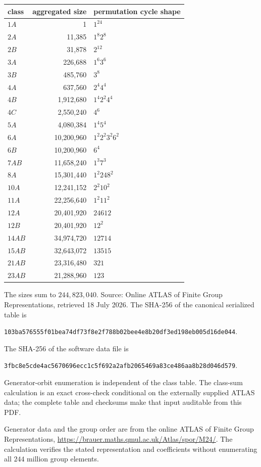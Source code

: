 \documentclass[11pt]{article}
\begin{document}
\begin{center}\scriptsize
\begin{tabular}{@{}lrl@{}}\toprule
class & aggregated size & permutation cycle shape\\\midrule
$1A$&1&$1^{24}$\\
$2A$&11,385&$1^8 2^8$\\
$2B$&31,878&$2^{12}$\\
$3A$&226,688&$1^6 3^6$\\
$3B$&485,760&$3^8$\\
$4A$&637,560&$2^4 4^4$\\
$4B$&1,912,680&$1^4 2^2 4^4$\\
$4C$&2,550,240&$4^6$\\
$5A$&4,080,384&$1^4 5^4$\\
$6A$&10,200,960&$1^2 2^2 3^2 6^2$\\
$6B$&10,200,960&$6^4$\\
$7AB$&11,658,240&$1^3 7^3$\\
$8A$&15,301,440&$1^2 2 4 8^2$\\
$10A$&12,241,152&$2^2 10^2$\\
$11A$&22,256,640&$1^2 11^2$\\
$12A$&20,401,920&$2 4 6 12$\\
$12B$&20,401,920&$12^2$\\
$14AB$&34,974,720&$1 2 7 14$\\
$15AB$&32,643,072&$1 3 5 15$\\
$21AB$&23,316,480&$3 21$\\
$23AB$&21,288,960&$1 23$\\\bottomrule
\end{tabular}
\end{center}
The sizes sum to $244{,}823{,}040$.  Source: Online ATLAS of Finite Group
Representations, retrieved 18 July 2026.  The SHA-256 of the canonical
serialized table is
\begin{center}\footnotesize
\texttt{103ba576555f01bea74df73f8e2f788b02bee4e8b20df3ed198eb005d16de044}.
\end{center}
The SHA-256 of the software data file is
\begin{center}\footnotesize
\texttt{3fbc8e5cde4ac5670696ecc1c5f692a2afb2065469a83ce486aa8b28d046d579}.
\end{center}

Generator-orbit enumeration is independent of the class table.  The class-sum
calculation is an exact cross-check conditional on the externally supplied
ATLAS data; the complete table and checksums make that input auditable from
this PDF.

Generator data and the group order are from the online ATLAS of Finite Group
Representations, \url{https://brauer.maths.qmul.ac.uk/Atlas/spor/M24/}.
The calculation verifies the stated representation and coefficients without
enumerating all $244$ million group elements.
\end{document}

